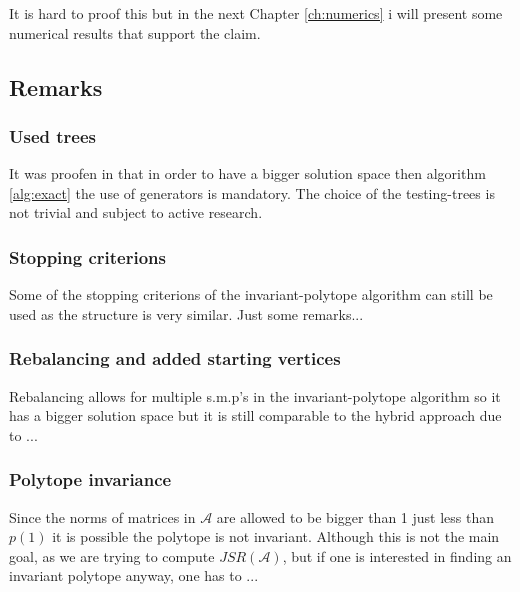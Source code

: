 It is hard to proof this but in the next Chapter \ref{ch:numerics} i will present some numerical results that support the claim.

\subsection*{Remarks}
\subsubsection*{Used trees}
It was proofen in \citep{mollerTreebasedApproachJoint2014} that in order to have a bigger solution space then algorithm \ref{alg:exact} the use of generators is mandatory. 
The choice of the testing-trees is not trivial and subject to active research. 
\subsubsection*{Stopping criterions}
Some of the stopping criterions of the invariant-polytope algorithm can still be used as the structure is very similar. 
Just some remarks...
\subsubsection*{Rebalancing and added starting vertices}
Rebalancing allows for multiple s.m.p's in the invariant-polytope algorithm so it has a bigger solution space but it is still comparable to the hybrid approach due to ...
\subsubsection*{Polytope invariance}
Since the norms of matrices in $\mathcal{A}$ are allowed to be bigger than 1 just less than $p(1)$ it is possible the polytope is not invariant. Although this is not the main goal, as we are trying to compute $JSR(\mathcal{A})$, but if one is interested in finding an invariant polytope anyway, one has to ...

